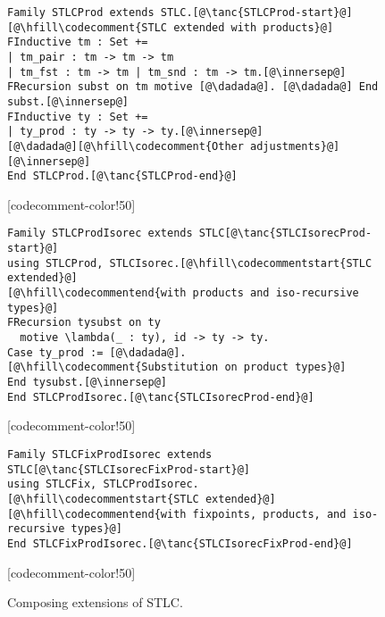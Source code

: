 \begin{figure}
\begin{minipage}{\textwidth}
\begin{multicols}{2}
\begin{lstlisting}
Family STLCProd extends STLC.[@\tanc{STLCProd-start}@]
[@\hfill\codecomment{STLC extended with products}@]
FInductive tm : Set +=
| tm_pair : tm -> tm -> tm
| tm_fst : tm -> tm | tm_snd : tm -> tm.[@\innersep@]
FRecursion subst on tm motive [@\dadada@]. [@\dadada@] End subst.[@\innersep@]
FInductive ty : Set +=
| ty_prod : ty -> ty -> ty.[@\innersep@]
[@\dadada@][@\hfill\codecomment{Other adjustments}@][@\innersep@]
End STLCProd.[@\tanc{STLCProd-end}@]
\end{lstlisting}

[codecomment-color!50]

\vspace{-13pt}


\begin{lstlisting}
Family STLCProdIsorec extends STLC[@\tanc{STLCIsorecProd-start}@]
using STLCProd, STLCIsorec.[@\hfill\codecommentstart{STLC extended}@]
[@\hfill\codecommentend{with products and iso-recursive types}@]
FRecursion tysubst on ty
  motive \lambda(_ : ty), id -> ty -> ty.
Case ty_prod := [@\dadada@].[@\hfill\codecomment{Substitution on product types}@]
End tysubst.[@\innersep@]
End STLCProdIsorec.[@\tanc{STLCIsorecProd-end}@]
\end{lstlisting}

[codecomment-color!50]

\vspace{-12pt}


\begin{lstlisting}
Family STLCFixProdIsorec extends STLC[@\tanc{STLCIsorecFixProd-start}@]
using STLCFix, STLCProdIsorec.[@\hfill\codecommentstart{STLC extended}@]
[@\hfill\codecommentend{with fixpoints, products, and iso-recursive types}@]
End STLCFixProdIsorec.[@\tanc{STLCIsorecFixProd-end}@]
\end{lstlisting}

[codecomment-color!50]

\end{multicols}
\end{minipage}

\vspace{-15pt}

\caption{Composing extensions of STLC.}
\label{fig:stlc-isorec-prod}
\end{figure}